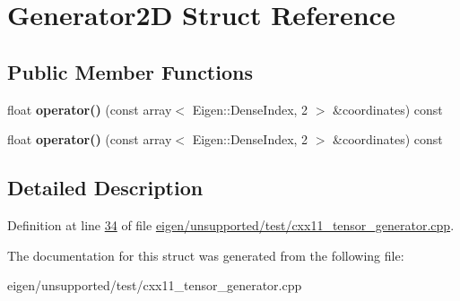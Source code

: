 \hypertarget{struct_generator2_d}{}\section{Generator2D Struct Reference}
\label{struct_generator2_d}
\subsection*{Public Member Functions}
\begin{DoxyCompactItemize}
\item 
\mbox{\label{struct_generator2_d_a1d8f59199d40489232d10cebea494f9c}} 
float {\bfseries operator()} (const array$<$ Eigen\+::\+Dense\+Index, 2 $>$ \&coordinates) const
\item 
\mbox{\label{struct_generator2_d_a1d8f59199d40489232d10cebea494f9c}} 
float {\bfseries operator()} (const array$<$ Eigen\+::\+Dense\+Index, 2 $>$ \&coordinates) const
\end{DoxyCompactItemize}


\subsection{Detailed Description}


Definition at line \hyperlink{eigen_2unsupported_2test_2cxx11__tensor__generator_8cpp_source_l00034}{34} of file \hyperlink{eigen_2unsupported_2test_2cxx11__tensor__generator_8cpp_source}{eigen/unsupported/test/cxx11\+\_\+tensor\+\_\+generator.\+cpp}.



The documentation for this struct was generated from the following file\+:\begin{DoxyCompactItemize}
\item 
eigen/unsupported/test/cxx11\+\_\+tensor\+\_\+generator.\+cpp\end{DoxyCompactItemize}

